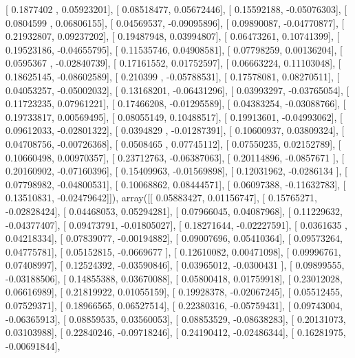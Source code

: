 \documentclass{article}
\begin{document}
       [ 0.1877402 ,  0.05923201],
       [ 0.08518477,  0.05672446],
       [ 0.15592188, -0.05076303],
       [ 0.0804599 ,  0.06806155],
       [ 0.04569537, -0.09095896],
       [ 0.09890087, -0.04770877],
       [ 0.21932807,  0.09237202],
       [ 0.19487948,  0.03994807],
       [ 0.06473261,  0.10741399],
       [ 0.19523186, -0.04655795],
       [ 0.11535746,  0.04908581],
       [ 0.07798259,  0.00136204],
       [ 0.0595367 , -0.02840739],
       [ 0.17161552,  0.01752597],
       [ 0.06663224,  0.11103048],
       [ 0.18625145, -0.08602589],
       [ 0.210399  , -0.05788531],
       [ 0.17578081,  0.08270511],
       [ 0.04053257, -0.05002032],
       [ 0.13168201, -0.06431296],
       [ 0.03993297, -0.03765054],
       [ 0.11723235,  0.07961221],
       [ 0.17466208, -0.01295589],
       [ 0.04383254, -0.03088766],
       [ 0.19733817,  0.00569495],
       [ 0.08055149,  0.10488517],
       [ 0.19913601, -0.04993062],
       [ 0.09612033, -0.02801322],
       [ 0.0394829 , -0.01287391],
       [ 0.10600937,  0.03809324],
       [ 0.04708756, -0.00726368],
       [ 0.0508465 ,  0.07745112],
       [ 0.07550235,  0.02152789],
       [ 0.10660498,  0.00970357],
       [ 0.23712763, -0.06387063],
       [ 0.20114896, -0.0857671 ],
       [ 0.20160902, -0.07160396],
       [ 0.15409963, -0.01569898],
       [ 0.12031962, -0.0286134 ],
       [ 0.07798982, -0.04800531],
       [ 0.10068862,  0.08444571],
       [ 0.06097388, -0.11632783],
       [ 0.13510831, -0.02479642]]), array([[ 0.05883427,  0.01156747],
       [ 0.15765271, -0.02828424],
       [ 0.04468053,  0.05294281],
       [ 0.07966045,  0.04087968],
       [ 0.11229632, -0.04377407],
       [ 0.09473791, -0.01805027],
       [ 0.18271644, -0.02227591],
       [ 0.0361635 ,  0.04218334],
       [ 0.07839077, -0.00194882],
       [ 0.09007696,  0.05410364],
       [ 0.09573264,  0.04775781],
       [ 0.05152815, -0.0669677 ],
       [ 0.12610082,  0.00471098],
       [ 0.09996761,  0.07408997],
       [ 0.12524392, -0.03590846],
       [ 0.03965012, -0.0300431 ],
       [ 0.09899555, -0.03188506],
       [ 0.14855388,  0.03670088],
       [ 0.05800418,  0.01759918],
       [ 0.23012028,  0.06616989],
       [ 0.21819922,  0.01055159],
       [ 0.19928378, -0.02067245],
       [ 0.05512455,  0.07529371],
       [ 0.18966565,  0.06527514],
       [ 0.22380316, -0.05759431],
       [ 0.09743004, -0.06365913],
       [ 0.08859535,  0.03560053],
       [ 0.08853529, -0.08638283],
       [ 0.20131073,  0.03103988],
       [ 0.22840246, -0.09718246],
       [ 0.24190412, -0.02486344],
       [ 0.16281975, -0.00691844],
\end{document}
